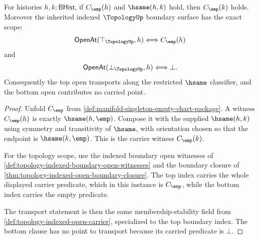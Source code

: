 \begin{theorem}
\label{thm:manifold-singleton-carrier-topology-scope}
For histories $h,k:\mathsf{BHist}$, if $C_{\emp}(h)$ and $\hsame(h,k)$ hold,
then $C_{\emp}(k)$ holds. Moreover the inherited indexed $\TopologyUp$ boundary
surface has the exact scope:
$$
\mathsf{OpenAt}(\top_{\TopologyUp},h)\Longleftrightarrow C_{\emp}(h)
$$
and
$$
\mathsf{OpenAt}(\bot_{\TopologyUp},h)\Longleftrightarrow \bot.
$$
Consequently the top open transports along the restricted $\hsame$ classifier,
and the bottom open contributes no carried point.
\end{theorem}
\begin{proof}
Unfold $C_{\emp}$ from
\autoref{def:manifold-singleton-empty-chart-package}. A witness
$C_{\emp}(h)$ is exactly $\hsame(h,\emp)$. Compose it with the supplied
$\hsame(h,k)$ using symmetry and transitivity of $\hsame$, with orientation
chosen so that the endpoint is $\hsame(k,\emp)$. This is the carrier witness
$C_{\emp}(k)$.

For the topology scope, use the indexed boundary open witnesses of
\autoref{def:topology-indexed-boundary-open-witnesses} and the boundary closure
of \autoref{thm:topology-indexed-open-boundary-closure}. The top index carries
the whole displayed carrier predicate, which in this instance is $C_{\emp}$,
while the bottom index carries the empty predicate.

The transport statement is then the same membership-stability field from
\autoref{def:topology-indexed-open-carrier}, specialized to the top boundary
index. The bottom clause has no point to transport because its carried
predicate is $\bot$.
\end{proof}


